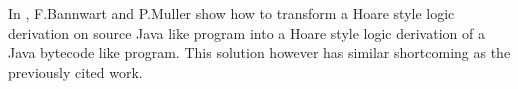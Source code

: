 
 


 In \cite{FB04LBT}, F.Bannwart and P.Muller show how to transform a Hoare style logic derivation on source Java like
 program into a Hoare style logic derivation of a Java bytecode like program. This solution however has similar  shortcoming
as the previously cited work.
    


